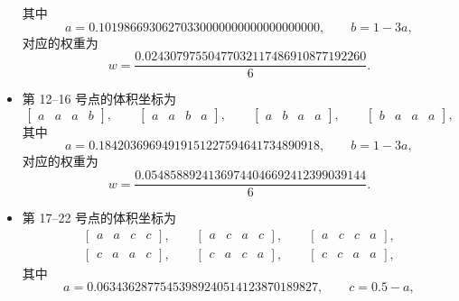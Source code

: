 \begin{itemize}[wide]
\begin{equation}
\end{equation}
其中
\begin{equation}
a=0.10198669306270330000000000000000000,\qquad b=1-3a,
\end{equation}
对应的权重为
\begin{equation}
w=\frac{0.02430797550477032117486910877192260}{6}.
\end{equation}
\item 第 12–16 号点的体积坐标为
\begin{equation}
\begin{bmatrix}a & a & a & b\end{bmatrix},\qquad\begin{bmatrix}a & a & b & a\end{bmatrix},\qquad\begin{bmatrix}a & b & a & a\end{bmatrix},\qquad\begin{bmatrix}b & a & a & a\end{bmatrix},
\end{equation}
其中
\begin{equation}
a=0.18420369694919151227594641734890918,\qquad b=1-3a,
\end{equation}
对应的权重为
\begin{equation}
w=\frac{0.05485889241369744046692412399039144}{6}.
\end{equation}
\item 第 17–22 号点的体积坐标为
\begin{equation}
\begin{gathered}\begin{bmatrix}a & a & c & c\end{bmatrix},\qquad\begin{bmatrix}a & c & a & c\end{bmatrix},\qquad\begin{bmatrix}a & c & c & a\end{bmatrix},\\
\begin{bmatrix}c & a & a & c\end{bmatrix},\qquad\begin{bmatrix}c & a & c & a\end{bmatrix},\qquad\begin{bmatrix}c & c & a & a\end{bmatrix},
\end{gathered}
\end{equation}
其中
\begin{equation}
a=0.06343628775453989240514123870189827,\qquad c=0.5-a,

\end{equation}
\end{itemize}
